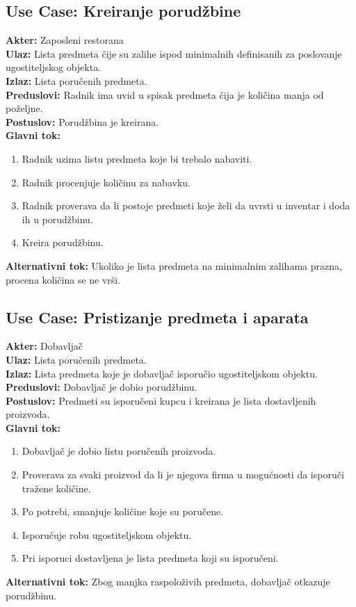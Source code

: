 \documentclass{article}
\begin{document}
\subsection{\textbf{Use Case}: Kreiranje porudžbine}
\textbf{Akter:} Zaposleni restorana\\
\textbf{Ulaz:} Lista predmeta čije su zalihe ispod minimalnih definisanih za poslovanje ugostiteljskog objekta.\\
\textbf{Izlaz:} Lista poručenih predmeta.\\
\textbf{Preduslovi:} Radnik ima uvid u spisak predmeta čija je količina manja od poželjne.\\
\textbf{Postuslov:} Porudžbina je kreirana.\\
\textbf{Glavni tok:} 
\begin{enumerate}
	\item Radnik uzima listu predmeta koje bi trebalo nabaviti.
	\item Radnik procenjuje količinu za nabavku. 
	\item Radnik proverava da li postoje predmeti koje želi da uvrsti u inventar i doda ih u porudžbinu.
	\item Kreira porudžbinu.
\end{enumerate}
\textbf{Alternativni tok:} Ukoliko je lista predmeta na minimalnim zalihama prazna, procena količina se ne vrši.\\

\subsection{\textbf{Use Case}:  Pristizanje predmeta i aparata}
\textbf{Akter:} Dobavljač\\
\textbf{Ulaz:} Lista poručenih predmeta.\\
\textbf{Izlaz:} Lista predmeta koje je dobavljač isporučio ugostiteljskom objektu.\\
\textbf{Preduslovi:} Dobavljač je dobio porudžbinu.\\
\textbf{Postuslov:} Predmeti su isporučeni kupcu i kreirana je lista dostavljenih proizvoda.\\
\textbf{Glavni tok:} 
\begin{enumerate}
	\item Dobavljač je dobio listu poručenih proizvoda.
	\item Proverava za svaki proizvod da li je njegova firma u mogućnosti da isporuči tražene količine.
	\item Po potrebi, smanjuje količine koje su poručene.
	\item Isporučuje robu ugostiteljskom objektu.
	\item Pri isporuci dostavljena je lista predmeta koji su isporučeni.
\end{enumerate}
\textbf{Alternativni tok:} Zbog manjka raspoloživih predmeta, dobavljač otkazuje porudžbinu.\\
\end{document}

